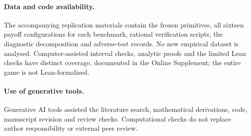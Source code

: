 \documentclass[11pt]{article}
\begin{document}
\paragraph{Data and code availability.}
The accompanying replication materials contain the frozen primitives, all sixteen payoff configurations for each benchmark, rational verification scripts, the diagnostic decomposition and adverse-test records.
No new empirical dataset is analysed.
Computer-assisted interval checks, analytic proofs and the limited Lean checks have distinct coverage, documented in the Online Supplement; the entire game is not Lean-formalised.
\paragraph{Use of generative tools.}
Generative AI tools assisted the literature search, mathematical derivations, code, manuscript revision and review checks.
Computational checks do not replace author responsibility or external peer review.

\begingroup\raggedright{}


\endgroup
\end{document}
